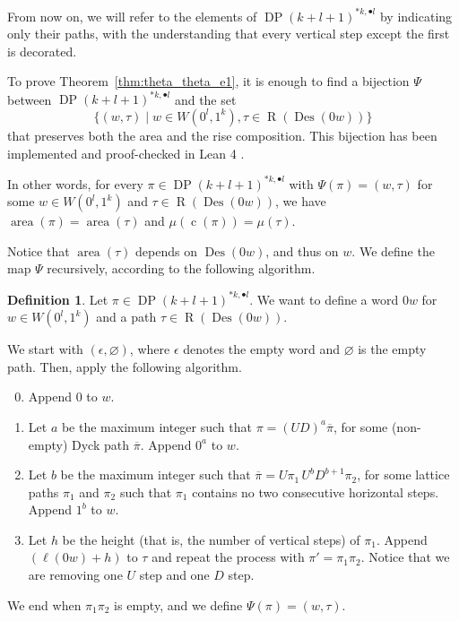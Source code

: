 \documentclass[reqno]{amsart}
\theoremstyle{plain}
\theoremstyle{definition}
\newtheorem{definition}[theorem]{Definition}
\theoremstyle{remark}
\DeclareMathOperator{\R}{R}
\DeclareMathOperator{\DP}{DP}
\DeclareMathOperator{\area}{area}
\DeclareMathOperator{\Des}{Des}
\DeclareMathOperator{\cc}{c}
\newcommand{\<}{\langle}
\renewcommand{\>}{\rangle}
\begin{document}
From now on, we will refer to the elements of $\DP(k+l+1)^{\ast k, \bullet l}$ by indicating only their paths, with the understanding that every vertical step except the first is decorated.

To prove Theorem~\ref{thm:theta_theta_e1}, it is enough to find a bijection $\Psi$ between $\DP(k+l+1)^{\ast k, \bullet l}$ and the set
\[ \{ (w, \tau) \mid w\in W \left(0^l,1^k\right), \tau \in \R(\Des(0w)) \} \]
that preserves both the area and the rise composition. This bijection has been implemented and proof-checked in Lean 4 \cite{Iraci2026code}.

In other words, for every $\pi \in \DP(k+l+1)^{\ast k, \bullet l}$ with $\Psi(\pi) = (w,\tau)$ for some $w \in W\left(0^l,1^k\right)$ and $\tau \in \R(\Des(0w))$, we have $\area(\pi)=\area(\tau)$ and $\mu(\cc(\pi))=\mu(\tau)$.

Notice that $\area(\tau)$ depends on $\Des(0w)$, and thus on $w$. We define the map $\Psi$ recursively, according to the following algorithm.

\begin{definition}
    \label{def:psi}
    Let $\pi \in \DP(k+l+1)^{\ast k, \bullet l}$. We want to define a word $0w$ for $w \in W(0^l, 1^k)$ and a path $\tau \in \R(\Des(0w))$. 
    
    We start with $(\epsilon, \varnothing)$, where $\epsilon$ denotes the empty word and $\varnothing$ is the empty path. Then, apply the following algorithm.

    \begin{enumerate}
      \setcounter{enumi}{-1}
        \item Append $0$ to $w$. \label{step:0}

        \item Let $a$ be the maximum integer such that $\pi = (UD)^a \overline{\pi}$, for some (non-empty) Dyck path $\overline{\pi}$. Append $0^a$ to $w$. \label{step:valleys}

        \item Let $b$ be the maximum integer such that $\overline{\pi} = U \pi_1 \,U^b D^{b+1} \pi_2$, for some lattice paths $\pi_1$ and $\pi_2$ such that $\pi_1$ contains no two consecutive horizontal steps. Append $1^b$ to $w$. \label{step:rises}

        \item Let $h$ be the height (that is, the number of vertical steps) of $\pi_1$. Append $(\ell(0w)+h)$ to $\tau$ and repeat the process with $\pi' = \pi_1 \pi_2$. Notice that we are removing one $U$ step and one $D$ step. \label{step:induction}
    \end{enumerate}

    We end when $\pi_1 \pi_2$ is empty, and we define $\Psi(\pi) = (w,\tau)$.
\end{definition}
\end{document}
